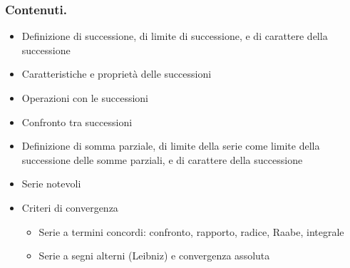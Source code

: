 \documentclass[letterpaper,10pt,italian]{jupyterBook}
\begin{document}
\subsubsection*{Contenuti.}

\sphinxAtStartPar
{\hyperref[\detokenize{ch/series/sequence-numerical-real:math-hs-sequence-numerical-real}]{}}
\begin{itemize}
\item {} 
\sphinxAtStartPar
Definizione di successione, di limite di successione, e di carattere della successione

\item {} 
\sphinxAtStartPar
Caratteristiche e proprietà delle successioni

\item {} 
\sphinxAtStartPar
Operazioni con le successioni

\item {} 
\sphinxAtStartPar
Confronto tra successioni

\end{itemize}

\sphinxAtStartPar
{\hyperref[\detokenize{ch/series/series-numerical-real:math-hs-series-numerical-real}]{}}
\begin{itemize}
\item {} 
\sphinxAtStartPar
Definizione di somma parziale, di limite della serie come limite della successione delle somme parziali, e di carattere della successione

\item {} 
\sphinxAtStartPar
Serie notevoli

\item {} 
\sphinxAtStartPar
Criteri di convergenza
\begin{itemize}
\item {} 
\sphinxAtStartPar
Serie a termini concordi: confronto, rapporto, radice, Raabe, integrale

\item {} 
\sphinxAtStartPar
Serie a segni alterni (Leibniz) e convergenza assoluta

\end{itemize}

\end{itemize}
\end{document}
